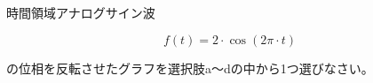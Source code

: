 時間領域アナログサイン波

\[
f(t) = 2 \cdot \cos( 2 \pi \cdot t )
\]

\bigskip
\noindent  の位相を反転させたグラフを選択肢a〜dの中から1つ選びなさい。
